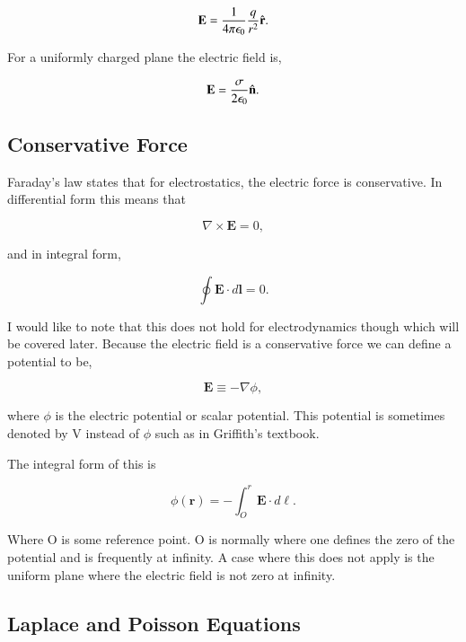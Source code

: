 \documentclass[preprint, review,12pt]{elsarticle}
\def\x{\times}
\def\.{\cdot}
\def\b{\textbf}
\def\bell{\bm{\ell}}
\def\={\equiv}
\def\curl{\nabla \x}
\newcommand{\hb}[1]{\hat{\b #1}}
\begin{document}
\begin{equation}
    \b{E}= \frac{1}{4 \pi \epsilon_0} \frac{q}{r^2}\hb{r}.
\end{equation}

For a uniformly charged plane the electric field is,

\begin{equation}
    \b{E} = \frac{\sigma}{2\epsilon_0}\hb{n}.
\end{equation}

\subsection{Conservative Force}

Faraday's law states that for electrostatics, the electric force is conservative. In differential form this means that

\begin{equation}
    \curl \b{E} = 0,
\end{equation}

and in integral form,

\begin{equation}
    \oint \b{E} \. d\b{l} = 0.
\end{equation}

I would like to note that this does not hold for electrodynamics though which will be covered later. Because the electric field is a conservative force we can define a potential to be,

\begin{equation}
    \b{E} \= -\nabla \phi,
\end{equation}

where $\phi$ is the electric potential or scalar potential. This potential is sometimes denoted by V instead of $\phi$ such as in Griffith's textbook.

The integral form of this is

\begin{equation}
    \phi(\b{r}) = - \int_O^r \b{E}\. d \bell.
\end{equation}

Where O is some reference point. O is normally where one defines the zero of the potential and is frequently at infinity. A case where this does not apply is the uniform plane where the electric field is not zero at infinity. 

\subsection{Laplace and Poisson Equations}
\end{document}
